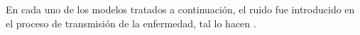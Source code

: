 
En cada uno de los modelos tratados a continuación, 
el ruido fue introducido en el proceso de transmisión de 
la enfermedad, tal lo hacen \textcite{gourierouxSIRModelStochastic2020}.


